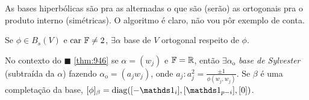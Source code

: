
\begin{note}
    As bases hiperbólicas são pra as alternadas o que são (serão) as ortogonais pra o produto interno (simétricas). O algoritmo é claro, não vou pôr exemplo de conta. 
\end{note}

\begin{theorem}
    \label{thm:946}
    Se \(\phi \in B_s(V)\) e \(\operatorname{car\ \mathbb{F} \neq 2}\), \(\exists \alpha \) base de \(V\) ortogonal respeito de \(\phi\).  
\end{theorem}


\begin{corollary}
    No contexto do \(\blacksquare\) \ref{thm:946} se \(\alpha = (w_j)\) e \(\mathbb{F} = \mathbb{R}\), então \(\exists \alpha_\text{o}\) \emph{base de Sylvester} (subtraída da \(\alpha\)) fazendo \(\alpha_\text{o} = (a_jw_j)\), onde  \(a_j : a_j^2 = \frac{\pm 1}{\phi(w_j,w_j)}\). Se \(\beta\) é uma completação da base, \([\phi]_\beta = \operatorname{diag}([-\id_i], [\id_{p-i}], [0])\). %
\end{corollary}

